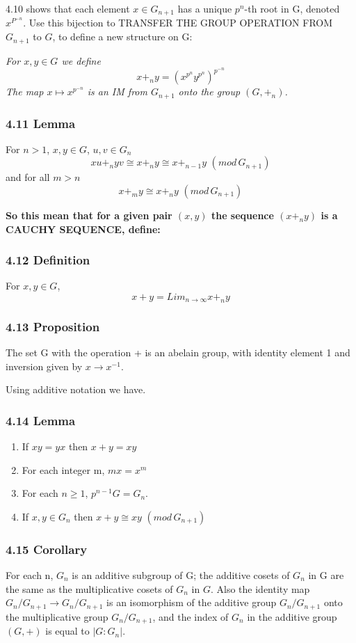 4.10 shows that each element $x\in G_{n+1}$ has a unique $p^n$-th root in G, denoted $x^{P^{-n}}$. Use this bijection to TRANSFER THE GROUP OPERATION FROM $G_{n+1}$ to $G$, to define a new structure on G:

\emph{For $x,y\in G$ we define
$$x+_n y = (x^{p^n}y^{p^n})^{p^{-n}}$$The map $x\mapsto x^{p^{-n}}$ is an IM from $G_{n+1}$ onto the group $(G, +_n)$.}

\subsubsection*{4.11 Lemma}
For $n>1$, $x,y \in G$, $u,v\in G_n$
$$xu+_n yv \cong x+_n y \cong x +_{n-1} y \,\,(mod\, G_{n+1})$$
and for all $m>n$
$$x+_m y \cong x+_n y \,\, (mod\,G_{n+1})$$

\textbf{So this mean that for a given pair $(x,y)$ the sequence $(x+_n y)$ is a CAUCHY SEQUENCE, define:}

\subsubsection*{4.12 Definition}
For $x,y\in G$,
$$x+y = Lim_{n\rightarrow\infty} x+_n y$$

\subsubsection*{4.13 Proposition}
The set G with the operation + is an abelain group, with identity element 1 and inversion given by $x\rightarrow x^{-1}$. 

Using additive notation we have.

\subsubsection*{4.14 Lemma}
\begin{enumerate}
\item If $xy=yx$ then $x+y = xy$
\item For each integer m, $mx = x^m$
\item For each $n\geq 1$, $p^{n-1}G = G_n$.
\item If $x,y\in G_n$ then $x+y \cong xy \,\, (mod\, G_{n+1})$
\end{enumerate}


\subsubsection*{4.15 Corollary}
For each n, $G_n$ is an additive subgroup of G; the additive cosets of $G_n$ in G are the same as the multiplicative cosets of $G_n$ in $G$. Also the identity map $G_n / G_{n+1} \rightarrow G_n / G_{n+1}$ is an isomorphism of the additive group $G_n / G_{n+1}$ onto the multiplicative group $G_n/ G_{n+1}$, and the index of $G_n$ in the additive group $(G, +)$ is equal to $|G: G_n|$.

